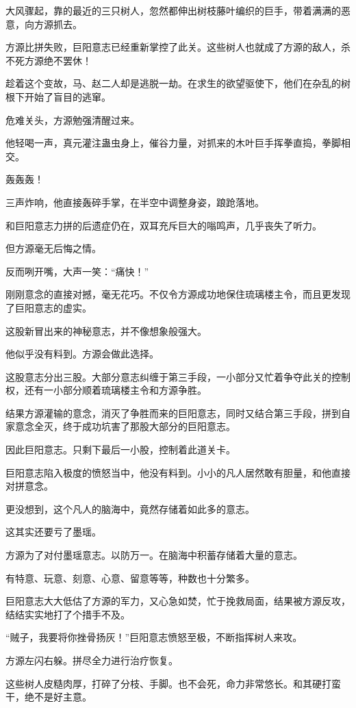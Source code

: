 \begin{this_body}
大风骤起，靠的最近的三只树人，忽然都伸出树枝藤叶编织的巨手，带着满满的恶意，向方源抓去。

方源比拼失败，巨阳意志已经重新掌控了此关。这些树人也就成了方源的敌人，杀不死方源绝不罢休！

趁着这个变故，马、赵二人却是逃脱一劫。在求生的欲望驱使下，他们在杂乱的树根下开始了盲目的逃窜。

危难关头，方源勉强清醒过来。

他轻喝一声，真元灌注蛊虫身上，催谷力量，对抓来的木叶巨手挥拳直捣，拳脚相交。

轰轰轰！

三声炸响，他直接轰碎手掌，在半空中调整身姿，踉跄落地。

和巨阳意志力拼的后遗症仍在，双耳充斥巨大的嗡鸣声，几乎丧失了听力。

但方源毫无后悔之情。

反而咧开嘴，大声一笑：“痛快！”

刚刚意念的直接对撼，毫无花巧。不仅令方源成功地保住琉璃楼主令，而且更发现了巨阳意志的虚实。

这股新冒出来的神秘意志，并不像想象般强大。

他似乎没有料到。方源会做此选择。

这股意志分出三股。大部分意志纠缠于第三手段，一小部分又忙着争夺此关的控制权，还有一小部分顺着琉璃楼主令和方源争胜。

结果方源灌输的意念，消灭了争胜而来的巨阳意志，同时又结合第三手段，拼到自家意念全灭，终于成功坑害了那股大部分的巨阳意志。

因此巨阳意志。只剩下最后一小股，控制着此道关卡。

巨阳意志陷入极度的愤怒当中，他没有料到。小小的凡人居然敢有胆量，和他直接对拼意念。

更没想到，这个凡人的脑海中，竟然存储着如此多的意志。

这其实还要亏了墨瑶。

方源为了对付墨瑶意志。以防万一。在脑海中积蓄存储着大量的意志。

有特意、玩意、刻意、心意、留意等等，种数也十分繁多。

巨阳意志大大低估了方源的军力，又心急如焚，忙于挽救局面，结果被方源反攻，结结实实地打了个措手不及。

“贼子，我要将你挫骨扬灰！”巨阳意志愤怒至极，不断指挥树人来攻。

方源左闪右躲。拼尽全力进行治疗恢复。

这些树人皮糙肉厚，打碎了分枝、手脚。也不会死，命力非常悠长。和其硬打蛮干，绝不是好主意。


\end{this_body}
